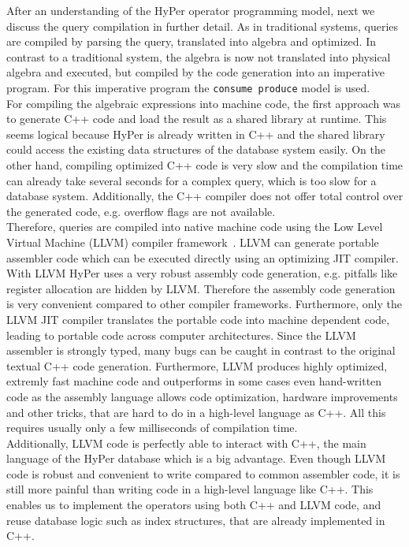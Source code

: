 After an understanding of the HyPer operator programming model, next we discuss the query compilation in further detail. As in traditional systems, queries are compiled by parsing the query, translated into algebra and optimized. In contrast to a traditional system, the algebra is now not translated into physical algebra and executed, but compiled by the code generation into an imperative program. For this imperative program the \texttt{consume produce} model is used.
\\
For compiling the algebraic expressions into machine code, the first approach was to generate C++ code and load the result as a shared library at runtime. This seems logical because HyPer is already written in C++ and the shared library could access the existing data structures of the database system easily. On the other hand, compiling optimized C++ code is very slow and the compilation time can already take several seconds for a complex query, which is too slow for a database system. Additionally, the C++ compiler does not offer total control over the generated code, e.g. overflow flags are not available. 
\\
Therefore, queries are compiled into native machine code using the Low Level Virtual Machine (LLVM) compiler framework~\parencite{LLVM}. LLVM can generate portable assembler code which can be executed directly using an optimizing JIT compiler. With LLVM HyPer uses a very robust assembly code generation, e.g. pitfalls like register allocation are hidden by LLVM. Therefore the assembly code generation is very convenient compared to other compiler frameworks. Furthermore, only the LLVM JIT compiler translates the portable code into machine dependent code, leading to portable code across computer architectures. Since the LLVM assembler is strongly typed, many bugs can be caught in contrast to the original textual C++ code generation. Furthermore, LLVM produces highly optimized, extremly fast machine code and outperforms in some cases even hand-written code as the assembly language allows code optimization, hardware improvements and other tricks, that are hard to do in a high-level language as C++. All this requires usually only a few milliseconds of compilation time.
\\
Additionally, LLVM code is perfectly able to interact with C++, the main language of the HyPer database which is a big advantage. Even though LLVM code is robust and convenient to write compared to common assembler code, it is still more painful than writing code in a high-level language like C++. This enables us to implement the operators using both C++ and LLVM code, and reuse database logic such as index structures, that are already implemented in C++. 
